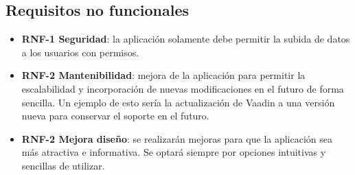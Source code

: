 \subsection{Requisitos no funcionales}
\begin{itemize}
	\item \textbf{RNF-1 Seguridad}: la aplicación solamente debe permitir la subida de datos a los usuarios con permisos.
	
	\item \textbf{RNF-2 Mantenibilidad}: mejora de la aplicación para permitir la escalabilidad y incorporación de nuevas modificaciones en el futuro de forma sencilla. Un ejemplo de esto sería la actualización de Vaadin a una versión nueva para conservar el soporte en el futuro.
	
	\item \textbf{RNF-2 Mejora diseño}: se realizarán mejoras para que la aplicación sea más atractiva e informativa. Se optará siempre por opciones intuitivas y sencillas de utilizar.

\end{itemize}
